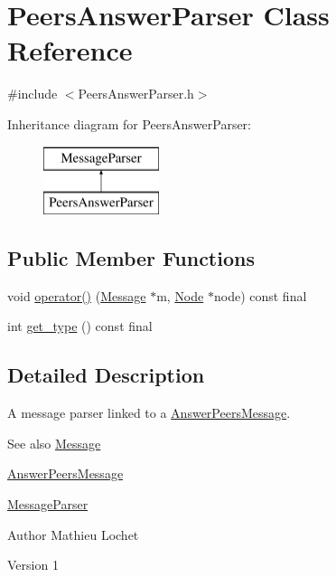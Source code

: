 \hypertarget{classPeersAnswerParser}{}\section{Peers\+Answer\+Parser Class Reference}
\label{classPeersAnswerParser}


{\ttfamily \#include $<$Peers\+Answer\+Parser.\+h$>$}

Inheritance diagram for Peers\+Answer\+Parser\+:\begin{figure}[H]
\begin{center}
\leavevmode
\includegraphics[height=2.000000cm]{classPeersAnswerParser}
\end{center}
\end{figure}
\subsection*{Public Member Functions}
\begin{DoxyCompactItemize}
\item 
void \mbox{\hyperlink{classPeersAnswerParser_ad566095c0594805919e7e4d14f8b076e}{operator()}} (\mbox{\hyperlink{classMessage}{Message}} $\ast$m, \mbox{\hyperlink{classNode}{Node}} $\ast$node) const final
\item 
int \mbox{\hyperlink{classPeersAnswerParser_a5f88ed07616ae3d17726f27b263645a6}{get\+\_\+type}} () const final
\end{DoxyCompactItemize}


\subsection{Detailed Description}
A message parser linked to a \mbox{\hyperlink{classAnswerPeersMessage}{Answer\+Peers\+Message}}. \begin{DoxySeeAlso}{See also}
\mbox{\hyperlink{classMessage}{Message}} 

\mbox{\hyperlink{classAnswerPeersMessage}{Answer\+Peers\+Message}} 

\mbox{\hyperlink{classMessageParser}{Message\+Parser}}
\end{DoxySeeAlso}
\begin{DoxyAuthor}{Author}
Mathieu Lochet 
\end{DoxyAuthor}
\begin{DoxyVersion}{Version}
1 
\end{DoxyVersion}



